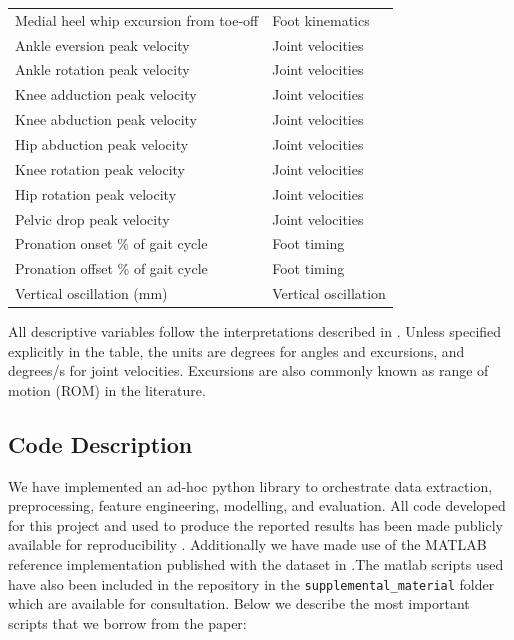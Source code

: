 \begin{table}[ht]
\begin{tabular}{lp{}}
    Medial heel whip excursion from toe-off & Foot kinematics \\
    Ankle eversion peak velocity & Joint velocities \\
    Ankle rotation peak velocity & Joint velocities \\
    Knee adduction peak velocity & Joint velocities \\
    Knee abduction peak velocity & Joint velocities \\
    Hip abduction peak velocity & Joint velocities \\
    Knee rotation peak velocity & Joint velocities \\
    Hip rotation peak velocity & Joint velocities \\
    Pelvic drop peak velocity & Joint velocities \\
    Pronation onset \% of gait cycle & Foot timing \\
    Pronation offset \% of gait cycle & Foot timing \\
    Vertical oscillation (mm) & Vertical oscillation \\
    \hline
    \end{tabular}
\end{table}

All descriptive variables follow the interpretations described in \citet{Bartlett2014}. Unless specified explicitly in the table, the units are degrees for angles and excursions, and degrees/s for joint velocities. Excursions are also commonly known as range of motion (ROM) in the literature. 

\subsection{Code Description}\label{subsec:method-code-description}
We have implemented an ad-hoc python library to orchestrate data extraction, preprocessing, feature engineering, modelling, and evaluation. All code developed for this project and used to produce the reported results has been made publicly available for reproducibility \cite{Zapater_Reig_Running_Injury_Clinic_2025}. Additionally we have made use of the MATLAB reference implementation published with the dataset in \cite{Ferber2024}.The matlab scripts used have also been included in the repository in the \texttt{supplemental\_material} folder which are available for consultation. Below we describe the most important scripts that we borrow from the paper:

